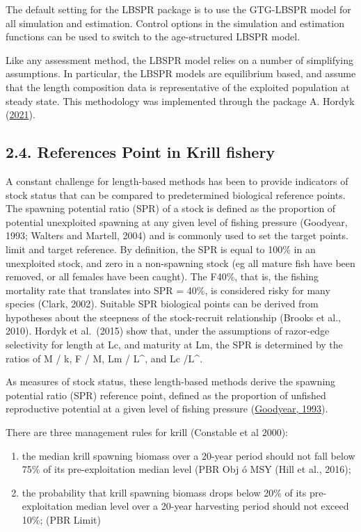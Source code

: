 \documentclass[
]{article}
\begin{document}
The default setting for the LBSPR package is to use the GTG-LBSPR model
for all simulation and estimation. Control options in the simulation and
estimation functions can be used to switch to the age-structured LBSPR
model.

Like any assessment method, the LBSPR model relies on a number of
simplifying assumptions. In particular, the LBSPR models are equilibrium
based, and assume that the length composition data is representative of
the exploited population at steady state. This methodology was
implemented through the package A. Hordyk
(\protect\hyperlink{ref-LBSPR2021}{2021}).

\hypertarget{references-point-in-krill-fishery}{%
\subsection{2.4. References Point in Krill
fishery}\label{references-point-in-krill-fishery}}

A constant challenge for length-based methods has been to provide
indicators of stock status that can be compared to predetermined
biological reference points. The spawning potential ratio (SPR) of a
stock is defined as the proportion of potential unexploited spawning at
any given level of fishing pressure (Goodyear, 1993; Walters and
Martell, 2004) and is commonly used to set the target points. limit and
target reference. By definition, the SPR is equal to 100\% in an
unexploited stock, and zero in a non-spawning stock (eg all mature fish
have been removed, or all females have been caught). The F40\%, that is,
the fishing mortality rate that translates into SPR = 40\%, is
considered risky for many species (Clark, 2002). Suitable SPR biological
points can be derived from hypotheses about the steepness of the
stock-recruit relationship (Brooks et al., 2010). Hordyk et al.~(2015)
show that, under the assumptions of razor-edge selectivity for length at
Lc, and maturity at Lm, the SPR is determined by the ratios of M / k, F
/ M, Lm / L\^{}, and Lc /L\^{}.

As measures of stock status, these length-based methods derive the
spawning potential ratio (SPR) reference point, defined as the
proportion of unfished reproductive potential at a given level of
fishing pressure (\protect\hyperlink{ref-Goodyear1993}{Goodyear, 1993}).

There are three management rules for krill (Constable et al 2000):

\begin{enumerate}
\def\labelenumi{(\arabic{enumi})}
\item
  the median krill spawning biomass over a 20-year period should not
  fall below 75\% of its pre-exploitation median level (PBR Obj ó MSY
  (Hill et al., 2016);
\item
  the probability that krill spawning biomass drops below 20\% of its
  pre-exploitation median level over a 20-year harvesting period should
  not exceed 10\%; (PBR Limit)
\end{enumerate}
\end{document}
